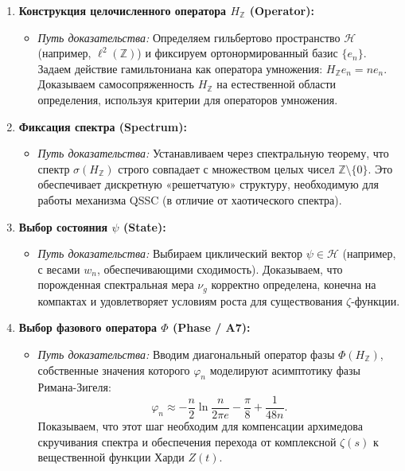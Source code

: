 \documentclass{article}
\numberwithin{equation}{section}
\theoremstyle{plain}
\theoremstyle{definition}
\theoremstyle{remark}
\def\phi{φ}\def\Phi{Φ}\def\psi{ψ}\def\Psi{Ψ}%
\begin{document}
\begin{enumerate}
    \item \textbf{Конструкция целочисленного оператора $H_{\mathbb{Z}}$ (Operator):}
    \begin{itemize}
        \item \emph{Путь доказательства:} Определяем гильбертово пространство $\mathcal{H}$ (например, $\ell^2(\mathbb{Z})$) и фиксируем ортонормированный базис $\{e_n\}$. Задаем действие гамильтониана как оператора умножения: $H_{\mathbb{Z}} e_n = n e_n$. Доказываем самосопряженность $H_{\mathbb{Z}}$ на естественной области определения, используя критерии для операторов умножения.
    \end{itemize}
    
    \item \textbf{Фиксация спектра (Spectrum):}
    \begin{itemize}
        \item \emph{Путь доказательства:} Устанавливаем через спектральную теорему, что спектр $\sigma(H_{\mathbb{Z}})$ строго совпадает с множеством целых чисел $\mathbb{Z} \setminus \{0\}$. Это обеспечивает дискретную «решетчатую» структуру, необходимую для работы механизма QSSC (в отличие от хаотического спектра).
    \end{itemize}

    \item \textbf{Выбор состояния $\psi$ (State):}
    \begin{itemize}
        \item \emph{Путь доказательства:} Выбираем циклический вектор $\psi \in \mathcal{H}$ (например, с весами $w_n$, обеспечивающими сходимость). Доказываем, что порожденная спектральная мера $\nu_g$ корректно определена, конечна на компактах и удовлетворяет условиям роста для существования $\zeta$-функции.
    \end{itemize}

    \item \textbf{Выбор фазового оператора $\Phi$ (Phase / A7):}
    \begin{itemize}
        \item \emph{Путь доказательства:} Вводим диагональный оператор фазы $\Phi(H_{\mathbb{Z}})$, собственные значения которого $\phi_n$ моделируют асимптотику фазы Римана-Зигеля:
        \[
        \phi_n \approx -\frac{n}{2}\ln\frac{n}{2\pi e} - \frac{\pi}{8} + \frac{1}{48n}.
        \]
        Показываем, что этот шаг необходим для компенсации архимедова скручивания спектра и обеспечения перехода от комплексной $\zeta(s)$ к вещественной функции Харди $Z(t)$.
    \end{itemize}


\end{enumerate}
\end{document}
